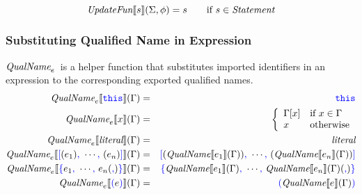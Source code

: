 \documentclass[a4paper]{article}
\newcommand{\Statement}{\emph{Statement}}
\newcommand{\code}[1]{\textcolor{blue}{\tt #1}}
\newcommand{\If}{\mbox{if}}
\newcommand{\Otherwise}{\mbox{otherwise}}
\newcommand{\UpdateFun}{\emph{UpdateFun}}
\newcommand{\QualName}{\emph{QualName}}
\begin{document}
\begin{equation*}
\UpdateFun \llbracket s \rrbracket (\Sigma, \phi) = s \qquad\If\ s \in \Statement
\end{equation*}

\subsubsection{Substituting Qualified Name in Expression}
$\QualName_e$\ is a helper function that substitutes imported identifiers in an expression to the corresponding exported qualified names.
\begin{eqnarray*}
\QualName_e \llbracket \code{this} \rrbracket (\Gamma) & = & \code{this} \\
\QualName_e \llbracket x \rrbracket (\Gamma) & = &
\left\{\begin{array}{ll}
\Gamma[x] & \If\ x \in \Gamma \\
x & \Otherwise
\end{array}\right. \\
\QualName_e \llbracket \emph{literal} \rrbracket (\Gamma) & = & \emph{literal} \\
\QualName_e \llbracket \code{[}(e_1)\code{,}\ \cdots\code{,}\ (e_n)\code{]} \rrbracket (\Gamma) & = & \code{[}(\QualName \llbracket e_1 \rrbracket (\Gamma))\code{,}\ \cdots\code{,}\ (\QualName \llbracket e_n \rrbracket (\Gamma))\code{]} \\
\QualName_e \llbracket \code{\{}e_1\code{,}\ \cdots\code{,}\ e_n(\code{,})\code{\}} \rrbracket (\Gamma) & = & \code{\{}\QualName \llbracket e_1 \rrbracket (\Gamma)\code{,}\ \cdots\code{,}\ \QualName \llbracket e_n \rrbracket (\Gamma)(\code{,})\code{\}} \\
\QualName_e \llbracket \code{(}e\code{)} \rrbracket (\Gamma) & = & \code{(}\QualName \llbracket e \rrbracket (\Gamma)\code{)}
\end{eqnarray*}
\end{document}
